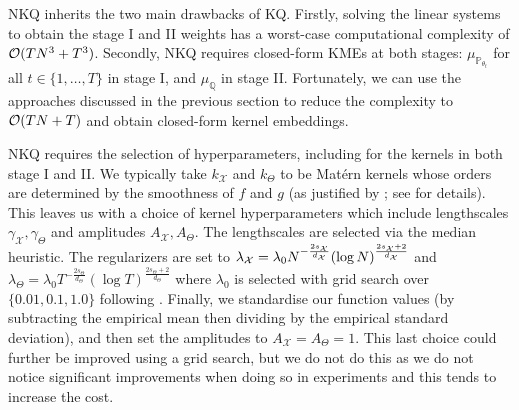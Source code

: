 NKQ inherits the two main drawbacks of KQ. Firstly, solving the linear systems to obtain the stage I and II weights has a worst-case  computational complexity of $\mathcal{O}(T N^3 + T^3)$. 
Secondly, NKQ requires closed-form KMEs at both stages: $\mu_{\mathbb{P}_{ \theta_t}}$ for all $t \in \{1,\ldots,T\}$ in stage I, and $\mu_{\mathbb{Q}}$ in stage II. Fortunately, we can use the approaches discussed in the previous section to reduce the complexity to $\mathcal{O}(TN + T)$ and obtain closed-form kernel embeddings. 
 



NKQ requires the selection of hyperparameters, including for the kernels in both stage I and II. 
We typically take $k_{\mathcal{X}}$ and $k_{\Theta}$ to be Mat\'ern kernels whose orders are determined by the smoothness of $f$ and $g$ (as justified by ; see  for details).
This leaves us with a choice of kernel hyperparameters which include lengthscales $\gamma_{\mathcal{X}}, \gamma_{\Theta}$ and amplitudes $A_{\mathcal{X}}, A_{\Theta}$. 
The lengthscales are selected via the median heuristic. 
The regularizers are set to $\lambda_{\mathcal{X}} = \lambda_0 N^{-\frac{2s_{\mathcal{X}}}{d_{\mathcal{X}}}} (\log N)^{\frac{2s_{\mathcal{X}}+2}{d_{\mathcal{X}}}}$ and $ \lambda_{\Theta} = \lambda_0 T^{-\frac{2s_\Theta}{d_\Theta}} (\log T)^{\frac{2s_\Theta+2}{d_\Theta}}$ where $\lambda_0$ is selected with grid search over $\{0.01, 0.1, 1.0\}$ following . Finally, we standardise our function values (by subtracting the empirical mean then dividing by the empirical standard deviation), and then set the amplitudes to $A_{\mathcal{X}}=A_{\Theta}=1$. This last choice could further be improved using a grid search, but we do not do this as we do not notice significant improvements when doing so in experiments and this tends to increase the cost.


